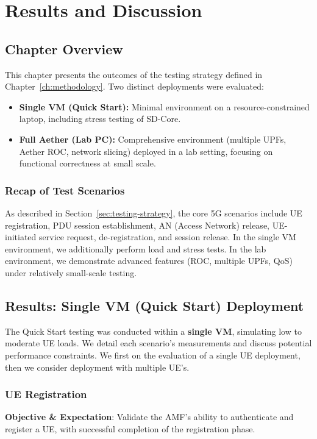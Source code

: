 \chapter{Results and Discussion}
\label{chap:results}

\section{Chapter Overview}
This chapter presents the outcomes of the testing strategy defined in Chapter~\ref{ch:methodology}. 
Two distinct deployments were evaluated:
\begin{itemize}
  \item \textbf{Single VM (Quick Start):} Minimal environment on a resource-constrained laptop, including stress testing of SD-Core.
  \item \textbf{Full Aether (Lab PC):} Comprehensive environment (multiple UPFs, Aether ROC, network slicing) deployed in a lab setting, focusing on functional correctness at small scale.
\end{itemize}

\subsection{Recap of Test Scenarios}
As described in Section~\ref{sec:testing-strategy}, the core 5G scenarios include UE registration, PDU session establishment, AN (Access Network) release, UE-initiated service request, de-registration, and session release. 
In the single VM environment, we additionally perform load and stress tests. 
In the lab environment, we demonstrate advanced features (ROC, multiple UPFs, QoS) under relatively small-scale testing.


\section{Results: Single VM (Quick Start) Deployment}
The Quick Start testing was conducted within a \textbf{single VM}, simulating low to moderate UE loads. We detail each scenario’s measurements and discuss potential performance constraints. We first on the evaluation of a single UE deployment, then we consider deployment with multiple UE's.

\subsection{UE Registration}
\textbf{Objective \& Expectation}: Validate the AMF’s ability to authenticate and register a UE, with successful completion of the registration phase. 

